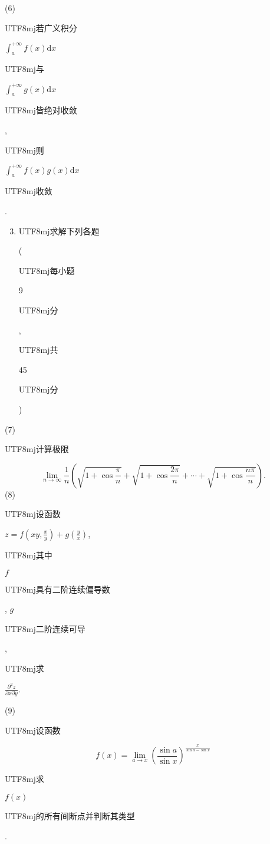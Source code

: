 \documentclass[10pt]{article}
\begin{document}
(6) \begin{CJK}{UTF8}{mj}若广义积分\end{CJK} $\int_{a}^{+\infty} f(x) \mathrm{d} x$ \begin{CJK}{UTF8}{mj}与\end{CJK} $\int_{a}^{+\infty} g(x) \mathrm{d} x$ \begin{CJK}{UTF8}{mj}皆绝对收敛\end{CJK}, \begin{CJK}{UTF8}{mj}则\end{CJK} $\int_{a}^{+\infty} f(x) g(x) \mathrm{d} x$ \begin{CJK}{UTF8}{mj}收敛\end{CJK}.

\begin{enumerate}
  \setcounter{enumi}{2}
  \item \begin{CJK}{UTF8}{mj}求解下列各题\end{CJK} (\begin{CJK}{UTF8}{mj}每小题\end{CJK} 9 \begin{CJK}{UTF8}{mj}分\end{CJK}, \begin{CJK}{UTF8}{mj}共\end{CJK} 45 \begin{CJK}{UTF8}{mj}分\end{CJK})
\end{enumerate}
(7) \begin{CJK}{UTF8}{mj}计算极限\end{CJK}
$$
\lim _{n \rightarrow \infty} \frac{1}{n}\left(\sqrt{1+\cos \frac{\pi}{n}}+\sqrt{1+\cos \frac{2 \pi}{n}}+\cdots+\sqrt{1+\cos \frac{n \pi}{n}}\right) .
$$
(8) \begin{CJK}{UTF8}{mj}设函数\end{CJK} $z=f\left(x y, \frac{x}{y}\right)+g\left(\frac{y}{x}\right)$, \begin{CJK}{UTF8}{mj}其中\end{CJK} $f$ \begin{CJK}{UTF8}{mj}具有二阶连续偏导数\end{CJK}, $g$ \begin{CJK}{UTF8}{mj}二阶连续可导\end{CJK}, \begin{CJK}{UTF8}{mj}求\end{CJK} $\frac{\partial^{2} z}{\partial x \partial y}$.

(9) \begin{CJK}{UTF8}{mj}设函数\end{CJK}
$$
f(x)=\lim _{a \rightarrow x}\left(\frac{\sin a}{\sin x}\right)^{\frac{x}{\sin a-\sin x}}
$$
\begin{CJK}{UTF8}{mj}求\end{CJK} $f(x)$ \begin{CJK}{UTF8}{mj}的所有间断点并判断其类型\end{CJK}.
\end{document}
